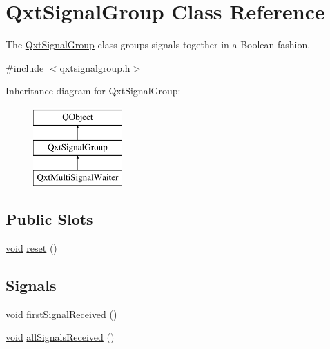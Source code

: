 \hypertarget{class_qxt_signal_group}{\section{Qxt\-Signal\-Group Class Reference}
\label{class_qxt_signal_group}
}


The \hyperlink{class_qxt_signal_group}{Qxt\-Signal\-Group} class groups signals together in a Boolean fashion.  




{\ttfamily \#include $<$qxtsignalgroup.\-h$>$}

Inheritance diagram for Qxt\-Signal\-Group\-:\begin{figure}[H]
\begin{center}
\leavevmode
\includegraphics[height=3.000000cm]{class_qxt_signal_group}
\end{center}
\end{figure}
\subsection*{Public Slots}
\begin{DoxyCompactItemize}
\item 
\hyperlink{group___u_a_v_objects_plugin_ga444cf2ff3f0ecbe028adce838d373f5c}{void} \hyperlink{class_qxt_signal_group_aad35385388040895c7cf21bfe9a753b3}{reset} ()
\end{DoxyCompactItemize}
\subsection*{Signals}
\begin{DoxyCompactItemize}
\item 
\hyperlink{group___u_a_v_objects_plugin_ga444cf2ff3f0ecbe028adce838d373f5c}{void} \hyperlink{class_qxt_signal_group_a7399023c039399d4eb540c0d58c6afc2}{first\-Signal\-Received} ()
\item 
\hyperlink{group___u_a_v_objects_plugin_ga444cf2ff3f0ecbe028adce838d373f5c}{void} \hyperlink{class_qxt_signal_group_a4c51ee7c10d27da5c3b086a40a711c61}{all\-Signals\-Received} ()
\end{DoxyCompactItemize}


